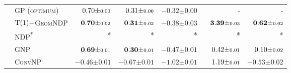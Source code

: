 \begin{table}[t]
\begin{tabular}{llrrrrr}
		\midrule
		\parbox[t]{2mm}{}
		 & \scshape GP (optimum)                                   & \(\hphantom{-}0.70 { \pm \scriptstyle 0.00 }\)                                  & \(\hphantom{-}0.31 { \pm \scriptstyle 0.00 }\)                                  & \(-0.32 { \pm \scriptstyle 0.00 }\)                                  & -                                                                             & -                                                                             \\
		 & \scshape\(\groupT[1]{}-\)GeomNDP  &  \(\hphantom{-}\mathbf{0.70} { \pm \scriptstyle 0.02 }\) &  \(\hphantom{-}\mathbf{0.31} { \pm \scriptstyle 0.02 }\) &  \(\mathbf{-0.38} { \pm \scriptstyle 0.03 }\) &  \(\hphantom{-}\mathbf{3.39} { \pm \scriptstyle 0.03 }\) &  \(\hphantom{-}\mathbf{0.62} { \pm \scriptstyle 0.02 }\) \\
		 & \scshape NDP\textsuperscript{*}                         & *                                                                             & *                                                                             & *                                                                  & *                                                                             & *                                                                             \\
		 & \scshape GNP                                            & \(\hphantom{-}\mathbf{0.69} { \pm \scriptstyle 0.01 }\)                         & \(\hphantom{-}\mathbf{0.30} { \pm \scriptstyle 0.01 }\)                         & \(-0.47 { \pm \scriptstyle 0.01 }\)                                  & \(\hphantom{-}0.42 { \pm \scriptstyle 0.01 }\)                                  & \(\hphantom{-}0.10 { \pm \scriptstyle 0.02 }\)                                  \\
		 & \scshape ConvNP                                         & \(-0.46 { \pm \scriptstyle 0.01 }\)                                             & \(-0.67 { \pm \scriptstyle 0.01 }\)                                             & \(-1.02 { \pm \scriptstyle 0.01 }\)                                  & \(\hphantom{-}1.19 { \pm \scriptstyle 0.01 }\)                                  & \(-0.53 { \pm \scriptstyle 0.02 }\)                                             \\

		\bottomrule
	\end{tabular}
\end{table}

